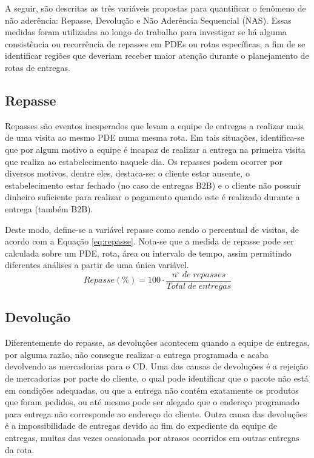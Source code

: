A seguir, são descritas as três variáveis propostas para quantificar o fenômeno de não aderência: Repasse, Devolução e Não Aderência Sequencial (NAS).
Essas medidas foram utilizadas ao longo do trabalho para investigar se há alguma consistência ou recorrência de repasses em PDEs ou rotas específicas, a fim de se identificar regiões que deveriam receber maior atenção durante o planejamento de rotas de entregas.

\subsection{Repasse}
 
Repasses são eventos inesperados que levam a equipe de entregas a realizar mais de uma visita ao mesmo PDE numa mesma rota. 
Em tais situações, identifica-se que por algum motivo a equipe é incapaz de realizar a entrega na primeira visita que realiza ao estabelecimento naquele dia.
Os repasses podem ocorrer por diversos motivos, dentre eles, destaca-se: o cliente estar ausente, o estabelecimento estar fechado (no caso de entregas B2B) e o cliente não possuir dinheiro suficiente para realizar o pagamento quando este é realizado durante a entrega (também B2B).

Deste modo, define-se a variável repasse como sendo o percentual de visitas, de acordo com a Equação \ref{eq:repasse}.
Nota-se que a medida de repasse pode ser calculada sobre um PDE, rota, área ou intervalo de tempo, assim permitindo diferentes análises a partir de uma única variável.
%
\begin{equation} \label{eq:repasse}
    Repasse (\%) = 100 \cdot \frac{n^{\circ} \; de \; repasses}{Total \; de \; entregas}
\end{equation}


\subsection{Devolução}

Diferentemente do repasse, as devoluções acontecem quando a equipe de entregas, por alguma razão, não consegue realizar a entrega programada e acaba devolvendo as mercadorias para o CD.
Uma das causas de devoluções é a rejeição de mercadorias por parte do cliente, o qual pode identificar que o pacote não está em condições adequadas, ou que a entrega não contém exatamente os produtos que foram pedidos, ou até mesmo pode ser alegado que o endereço programado para entrega não corresponde ao endereço do cliente.
%
Outra causa das devoluções é a impossibilidade de entregas devido ao fim do expediente da equipe de entregas, muitas das vezes ocasionada por atrasos ocorridos em outras entregas da rota.

